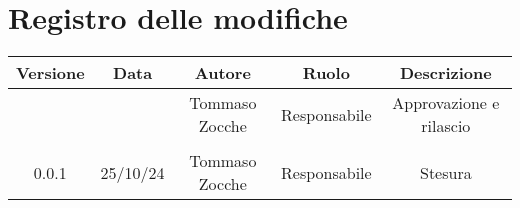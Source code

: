 
\section*{Registro delle modifiche}
\begin{table}[H]
    \begin{tabular}{|c|c|c|c|c|}
        \hline
         \textbf{Versione} &  \textbf{Data} &  \textbf{Autore} &  \textbf{Ruolo} & \textbf{Descrizione} \\
          \hline
          &  & Tommaso Zocche & Responsabile & Approvazione e rilascio\\
          \hline
          &  &  &  &  \\
          \hline
          0.0.1 & 25/10/24 & Tommaso Zocche & Responsabile & Stesura \\
          \hline
    \end{tabular}
\end{table}